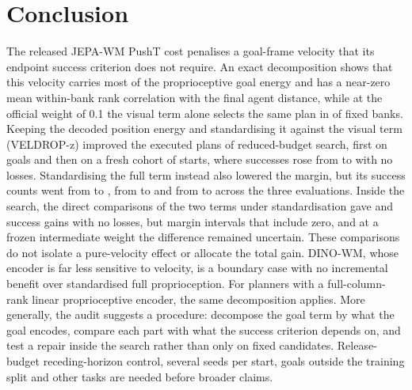 \section{Conclusion}
The released JEPA-WM PushT cost penalises a goal-frame velocity that its endpoint success criterion does not require.
An exact decomposition shows that this velocity carries most of the proprioceptive goal energy and has a
near-zero mean within-bank rank correlation with the final agent distance, while at the official weight of 0.1 the visual term alone selects the same plan in \RaVisOnlySame{} of \RaVisOnlyN{} fixed banks. Keeping the decoded position energy and standardising it against the visual term
(VELDROP-z) improved the executed plans of reduced-budget search, first on \RNineN{} goals and then on a fresh cohort of
\RTwN{} starts, where successes rose from \RTwRawSucc{} to \RTwVZSucc{} with no losses. Standardising the full term
instead also lowered the margin, but its success counts went from \REightBzeroSucc{} to \REightHstdSucc, from
\RElCzzSucc{} to \RElCzoSucc{} and from \RTwRawSucc{} to \RThSucc{} across the three evaluations. Inside the search, the
direct comparisons of the two terms under standardisation gave \RElGain{} and \RThGain{} success gains with no losses, but
margin intervals that include zero, and at a frozen intermediate weight the difference remained uncertain. These comparisons do not isolate a
pure-velocity effect or allocate the total gain. DINO-WM, whose encoder is far less sensitive to velocity, is a boundary
case with no incremental benefit over standardised full proprioception. For planners with a full-column-rank linear proprioceptive encoder, the same decomposition applies. More generally, the audit suggests a procedure: decompose the goal term by what the goal encodes, compare each part with what the success
criterion depends on, and test a repair inside the search rather than only on fixed candidates. Release-budget
receding-horizon control, several seeds per start, goals outside the training split and other tasks are needed before
broader claims.

\appendices
